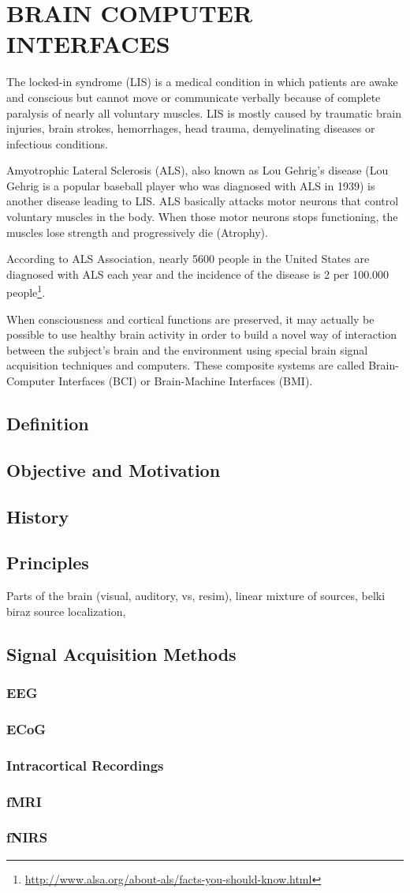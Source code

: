 \documentclass[12pt]{article}
\newcommand\mysection[1]{\vspace*{-0.35cm}\section{#1}\vspace*{6pt}\thispagestyle{empty}}
\newcommand\mysubsection[1]{\subsection{#1}}
\newcommand\mysubsubsection[1]{\subsubsection{#1}}
\numberwithin{equation}{section}
\numberwithin{figure}{section}
\numberwithin{table}{section}
\begin{document}
\mysection{BRAIN COMPUTER INTERFACES}\label{seq:bci}

\par{
    The locked-in syndrome (LIS) is a medical condition in which patients are awake and conscious but
    cannot move or communicate verbally because of complete paralysis of nearly all voluntary muscles.
    LIS is mostly caused by traumatic brain injuries, brain strokes, hemorrhages, head trauma, demyelinating diseases
    or infectious conditions.
}


\par {
    Amyotrophic Lateral Sclerosis (ALS), also known as Lou Gehrig's disease (Lou Gehrig is a popular baseball
    player who was diagnosed with ALS in 1939) is another disease leading to LIS. ALS basically attacks
    motor neurons that control voluntary muscles in the body. When those motor neurons stops functioning,
    the muscles lose strength and progressively die (Atrophy).
}

\par {
    According to ALS Association, nearly 5600 people in the United States are
    diagnosed with ALS each year and the incidence of the disease is 2 per 100.000
    people\footnote{\url{http://www.alsa.org/about-als/facts-you-should-know.html}}.
}

\par{
    When consciousness and cortical functions are preserved, it may actually be 
    possible to use healthy brain activity in order to build a novel way of interaction 
    between the subject's brain and the environment using special brain signal 
    acquisition techniques and computers. These composite systems are called 
    Brain-Computer Interfaces (BCI) or Brain-Machine Interfaces (BMI).
}

\mysubsection{Definition}\label{seq:bci_definition}
\mysubsection{Objective and Motivation}\label{seq:bci_motivation}
\mysubsection{History}\label{seq:bci_history}
\mysubsection{Principles}\label{seq:bci_principles}
\par{
Parts of the brain (visual, auditory, vs, resim), linear mixture of sources, belki biraz source localization, 
}

\mysubsection{Signal Acquisition Methods}\label{seq:bci_methods}
\mysubsubsection{EEG}\label{seq:bci_methods_eeg}
\mysubsubsection{ECoG}\label{seq:bci_methods_ecog}
\mysubsubsection{Intracortical Recordings}\label{seq:bci_methods_intracortical}
\mysubsubsection{fMRI}\label{seq:bci_methods_fmri}
\mysubsubsection{fNIRS}\label{seq:bci_methods_fnirs}
\end{document}
